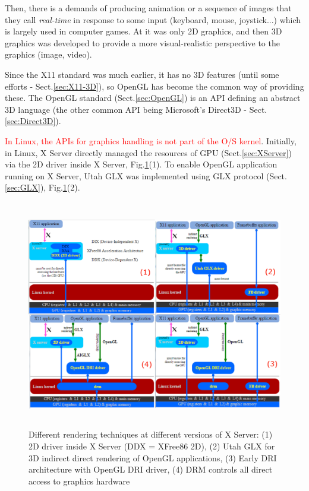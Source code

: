 Then, there is a demands of producing animation or a sequence of
images that they call {\it real-time} in response to some input
(keyboard, mouse, joystick...) which is largely used in computer
games. At it was only 2D graphics, and then 3D graphics was developed to provide a
more visual-realistic perspective to the graphics (image, video).

Since the X11 standard was much earlier, it has no 3D features (until some
efforts - Sect.\ref{sec:X11-3D}), so OpenGL has become the common way of
providing these. The OpenGL standard (Sect.\ref{sec:OpenGL}) is an API defining
an abstract 3D language (the other common API being Microsoft's Direct3D -
Sect.\ref{sec:Direct3D}).

\textcolor{red}{In Linux, the APIs for graphics handling is not part of the O/S
kernel}. Initially, in Linux, X Server directly managed the resources of GPU
(Sect.\ref{sec:XServer}) via the 2D driver inside X Server,
Fig.\ref{fig:XServer_rendering}(1). To enable OpenGL application running on X
Server, Utah GLX was implemented using GLX protocol (Sect.\ref{sec:GLX}),
Fig.\ref{fig:XServer_rendering}(2).

\begin{figure}[hbt]
  \centerline{\includegraphics[height=10cm,
    angle=0]{./images/XServer_rendering.eps}}
\caption{Different rendering techniques at different versions of X Server: (1)
2D driver inside X Server (DDX = XFree86 2D), (2) Utah GLX for 3D indirect
direct rendering of OpenGL applications, (3) Early DRI architecture with OpenGL DRI driver, (4) DRM
controls all direct access to graphics hardware}
\label{fig:XServer_rendering}
\end{figure}



